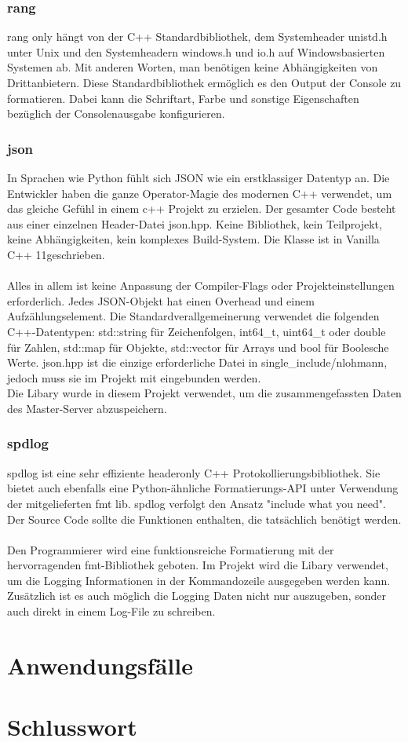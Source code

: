 \documentclass[a4paper,12pt]{article}
\begin{document}
\subsubsection{rang}
rang only hängt von der C++ Standardbibliothek, dem Systemheader unistd.h unter Unix und den Systemheadern windows.h und io.h auf Windows\-basierten Systemen ab. Mit anderen Worten, man benötigen keine Abhängigkeiten von Drittanbietern. Diese Standardbibliothek ermöglich es den
Output der Console zu formatieren. Dabei kann die Schriftart, Farbe und sonstige Eigenschaften bezüglich der Consolenausgabe konfigurieren.
\newpage
\noindent
\subsubsection{json}
In Sprachen wie Python fühlt sich JSON wie ein erstklassiger Datentyp an. 
Die Entwickler haben die ganze Operator-Magie des modernen C++ verwendet, um das gleiche Gefühl in einem c++ Projekt zu erzielen. 
Der gesamter Code besteht aus einer einzelnen Header-Datei json.hpp. Keine Bibliothek, kein Teilprojekt, keine Abhängigkeiten, kein komplexes Build-System. 
Die Klasse ist in Vanilla C++ 11geschrieben. \\\\
Alles in allem ist keine Anpassung der Compiler-Flags oder Projekteinstellungen erforderlich.
Jedes JSON-Objekt hat einen Overhead und einem Aufzählungselement. Die Standardverallgemeinerung verwendet die folgenden C++-Datentypen: std::string für Zeichenfolgen, int64\_t, uint64\_t oder double für Zahlen, std::map für Objekte, std::vector für Arrays und bool für Boolesche Werte. 
json.hpp ist die einzige erforderliche Datei in single\_include/nlohmann, jedoch muss sie im Projekt mit eingebunden werden. \\
Die Libary wurde in diesem Projekt verwendet, um die zusammengefassten Daten des Master-Server abzuspeichern.
\subsubsection{spdlog}
spdlog ist eine sehr effiziente headeronly C++ Protokollierungsbibliothek. Sie bietet auch ebenfalls eine Python-ähnliche Formatierungs-API unter Verwendung der mitgelieferten fmt lib.
spdlog verfolgt den Ansatz "include what you need". Der Source Code sollte die Funktionen enthalten, die tatsächlich benötigt werden.\\\\
Den Programmierer wird eine funktionsreiche Formatierung mit der hervorragenden fmt-Bibliothek geboten.
Im Projekt wird die Libary verwendet, um die Logging Informationen in der Kommandozeile ausgegeben werden kann. Zusätzlich ist es auch möglich
die Logging Daten nicht nur auszugeben, sonder auch direkt in einem Log-File zu schreiben.

\newpage
\noindent
\section{Anwendungsfälle}

\section{Schlusswort}
\newpage
\printbibliography
\end{document}
